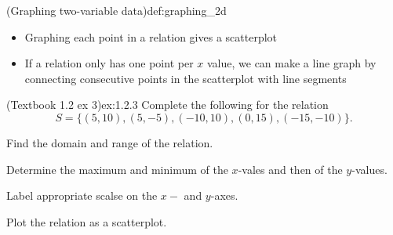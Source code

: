 \documentclass{article}
\begin{document}
\begin{definition}{(Graphing two-variable data)}{def:graphing_2d}
    \begin{itemize}
        \item Graphing each point in a relation gives a scatterplot
        \item If a relation only has one point per $x$ value, we can make a line graph by connecting consecutive points in the scatterplot with line segments
    \end{itemize}
\end{definition}

\begin{example}{(Textbook 1.2 ex 3)}{ex:1.2.3}
    Complete the following for the relation \[S=\bigl\{(5,10),(5,-5),(-10,10),(0,15),(-15,-10)\bigr\}.\]
    \begin{problem}
        \item Find the domain and range of the relation.
        \item Determine the maximum and minimum of the $x$-vales and then of the $y$-values.
        \item Label appropriate scalse on the $x-$ and $y$-axes.
        \item Plot the relation as a scatterplot.
    \end{problem}
\end{example}
\end{document}
